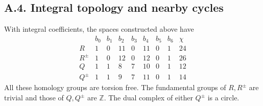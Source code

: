 \subsection{A.4. Integral topology and nearby cycles}

\begin{proposition}[A.4.1; Proved]\label{push:A41}
With integral coefficients, the spaces constructed above have
\[
\begin{array}{c|rrrrrrr|r}
&b_0&b_1&b_2&b_3&b_4&b_5&b_6&\chi\\\hline
R&1&0&11&0&11&0&1&24\\
R^\pm&1&0&12&0&12&0&1&26\\
Q&1&1&8&7&10&0&1&12\\
Q^\pm&1&1&9&7&11&0&1&14
\end{array}
\]
All these homology groups are torsion free. The fundamental
groups of $R,R^\pm$ are trivial and those of $Q,Q^\pm$ are
$\mathbb Z$. The dual complex of either $Q^\pm$ is a circle.
\end{proposition}
